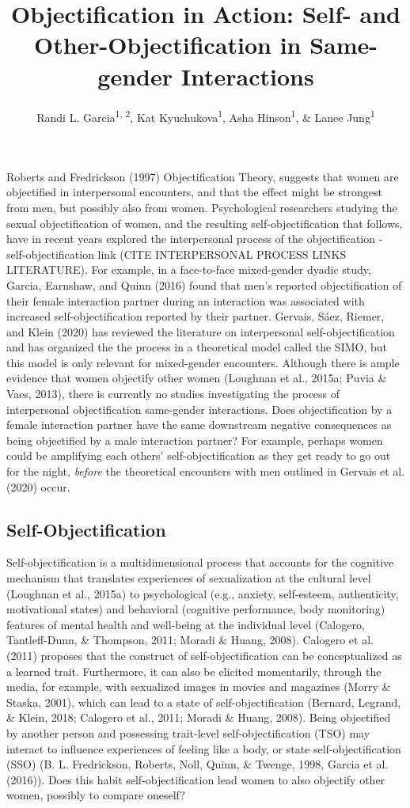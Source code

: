 \documentclass[man]{apa6}
\title{Objectification in Action: Self- and Other-Objectification in
Same-gender Interactions}
\author{Randi L. Garcia\textsuperscript{1, 2}, Kat
Kyuchukova\textsuperscript{1}, Asha Hinson\textsuperscript{1}, \& Lanee
Jung\textsuperscript{1}}
\date{}
\affiliation{
\vspace{0.5cm}
\textsuperscript{1} Department of Psychology, Smith College\\\textsuperscript{2} Program in Statistical and Data Sciences, Smith College}
\begin{document}
\maketitle

Roberts and Fredrickson (1997) Objectification Theory, suggests that
women are objectified in interpersonal encounters, and that the effect
might be strongest from men, but possibly also from women. Psychological
researchers studying the sexual objectification of women, and the
resulting self-objectification that follows, have in recent years
explored the interpersonal process of the objectification -
self-objectification link (CITE INTERPERSONAL PROCESS LINKS LITERATURE).
For example, in a face-to-face mixed-gender dyadic study, Garcia,
Earnshaw, and Quinn (2016) found that men's reported objectification of
their female interaction partner during an interaction was associated
with increased self-objectification reported by their partner. Gervais,
Sáez, Riemer, and Klein (2020) has reviewed the literature on
interpersonal self-objectification and has organized the the process in
a theoretical model called the SIMO, but this model is only relevant for
mixed-gender encounters. Although there is ample evidence that women
objectify other women (Loughnan et al., 2015a; Puvia \& Vaes, 2013),
there is currently no studies investigating the process of interpersonal
objectification same-gender interactions. Does objectification by a
female interaction partner have the same downstream negative
consequences as being objectified by a male interaction partner? For
example, perhaps women could be amplifying each others'
self-objectification as they get ready to go out for the night,
\emph{before} the theoretical encounters with men outlined in Gervais et
al. (2020) occur.

\subsection{Self-Objectification}\label{self-objectification}

Self-objectification is a multidimensional process that accounts for the
cognitive mechanism that translates experiences of sexualization at the
cultural level (Loughnan et al., 2015a) to psychological (e.g., anxiety,
self-esteem, authenticity, motivational states) and behavioral
(cognitive performance, body monitoring) features of mental health and
well-being at the individual level (Calogero, Tantleff-Dunn, \&
Thompson, 2011; Moradi \& Huang, 2008). Calogero et al. (2011) proposes
that the construct of self-objectification can be conceptualized as a
learned trait. Furthermore, it can also be elicited momentarily, through
the media, for example, with sexualized images in movies and magazines
(Morry \& Staska, 2001), which can lead to a state of
self-objectification (Bernard, Legrand, \& Klein, 2018; Calogero et al.,
2011; Moradi \& Huang, 2008). Being objectified by another person and
possessing trait-level self-objectification (TSO) may interact to
influence experiences of feeling like a body, or state
self-objectification (SSO) (B. L. Fredrickson, Roberts, Noll, Quinn, \&
Twenge, 1998, Garcia et al. (2016)). Does this habit
self-objectification lead women to also objectify other women, possibly
to compare oneself?
\end{document}
